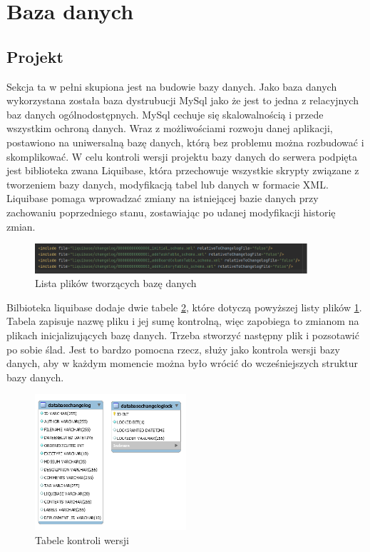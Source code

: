 \section{Baza danych}

\subsection{Projekt}
Sekcja ta w pełni skupiona jest na budowie bazy danych. Jako baza danych wykorzystana została baza dystrubucji MySql jako że jest to jedna z relacyjnych baz danych ogólnodostępnych. MySql cechuje się skalowalnością i przede wszystkim ochroną danych. Wraz z możliwościami rozwoju danej aplikacji, postawiono na uniwersalną bazę danych, którą bez problemu można rozbudować i skomplikować.
W celu kontroli wersji projektu bazy danych do serwera podpięta jest biblioteka zwana Liquibase, która przechowuje wszystkie skrypty związane z tworzeniem bazy danych, modyfikacją tabel lub danych w formacie XML. Liquibase pomaga wprowadzać zmiany na istniejącej bazie danych przy zachowaniu poprzedniego stanu, zostawiając po udanej modyfikacji historię zmian. 
\begin{figure}[h]
	\centering
	\includegraphics[width=0.90\textwidth]{liqubase}		
	\caption{Lista plików tworzących bazę danych }
	\label{listaplikow}
\end{figure}
Bilbioteka liquibase dodaje dwie tabele \ref{liqutable}, które dotyczą powyższej listy plików \ref{listaplikow}. Tabela zapisuje nazwę pliku i jej sumę kontrolną, więc zapobiega to zmianom na plikach inicjalizujących bazę danych. Trzeba stworzyć następny plik i pozsotawić po sobie ślad. Jest to bardzo pomocna rzecz, służy jako kontrola wersji bazy danych, aby w każdym momencie można było wrócić do wcześniejszych struktur bazy danych.
\begin{figure}[h]
	\centering
	\includegraphics[width=0.50\textwidth]{liquibasetables}
	\caption{ Tabele kontroli wersji}
	\label{liqutable}
\end{figure}

